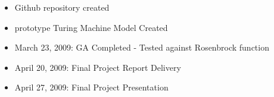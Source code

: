 \begin{itemize}
	\item Github repository created
	\item prototype Turing Machine Model Created
\end{itemize}

\begin{itemize}
	\item March 23, 2009: GA Completed - Tested against Rosenbrock function
	\item April 20, 2009: Final Project Report Delivery
	\item April 27, 2009: Final Project Presentation
\end{itemize}